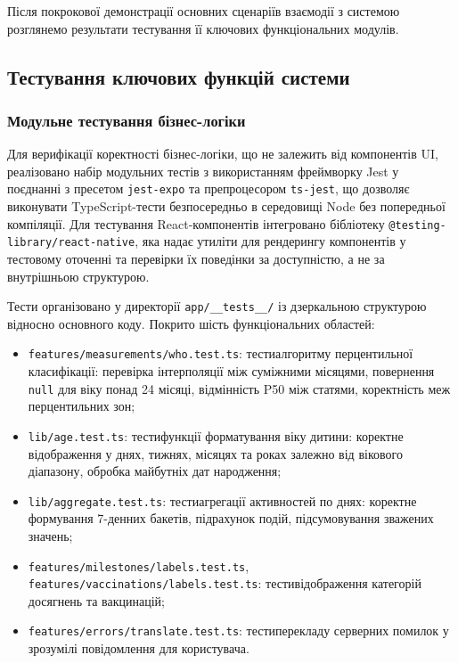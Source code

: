 Після покрокової демонстрації основних сценаріїв взаємодії з системою розглянемо результати тестування її ключових функціональних модулів.

\subsection{Тестування ключових функцій системи}

\subsubsection{Модульне тестування бізнес-логіки}

Для верифікації коректності бізнес-логіки, що не залежить від компонентів \gls{UI}, реалізовано набір модульних тестів з використанням фреймворку Jest у поєднанні з пресетом \texttt{jest-expo} та препроцесором \texttt{ts-jest}, що дозволяє виконувати TypeScript-тести безпосередньо в середовищі Node без попередньої компіляції. Для тестування React-компонентів інтегровано бібліотеку \texttt{@testing-library/react-native}, яка надає утиліти для рендерингу компонентів у тестовому оточенні та перевірки їх поведінки за доступністю, а не за внутрішньою структурою.

Тести організовано у директорії \texttt{app/\_\_tests\_\_/} із дзеркальною структурою відносно основного коду. Покрито шість функціональних областей:

\begin{itemize}
  \item \texttt{features/measurements/who.test.ts}: тестиалгоритму перцентильної класифікації: перевірка інтерполяції між суміжними місяцями, повернення \texttt{null} для віку понад 24 місяці, відмінність P50 між статями, коректність меж перцентильних зон;
  \item \texttt{lib/age.test.ts}: тестифункції форматування віку дитини: коректне відображення у днях, тижнях, місяцях та роках залежно від вікового діапазону, обробка майбутніх дат народження;
  \item \texttt{lib/aggregate.test.ts}: тестиагрегації активностей по днях: коректне формування 7-денних бакетів, підрахунок подій, підсумовування зважених значень;
  \item \texttt{features/milestones/labels.test.ts}, \texttt{features/vaccinations/labels.test.ts}: тестивідображення категорій досягнень та вакцинацій;
  \item \texttt{features/errors/translate.test.ts}: тестиперекладу серверних помилок у зрозумілі повідомлення для користувача.
\end{itemize}

